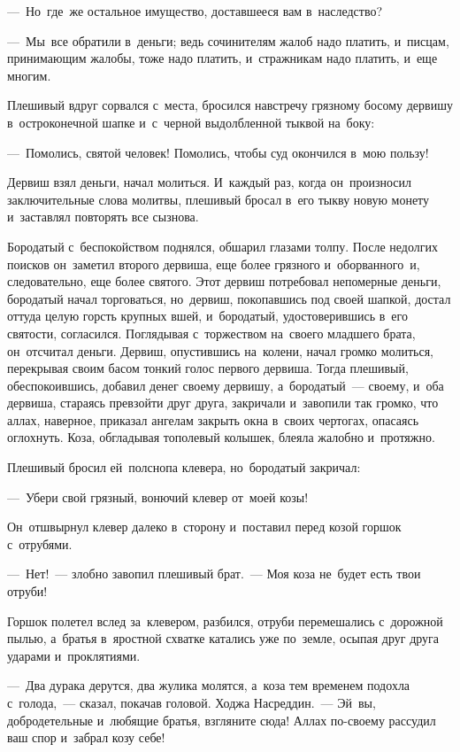 \documentclass[12pt,a4paper]{book}
\begin{document}
—~Но~где~же остальное имущество, доставшееся вам в~наследство?

—~Мы~все обратили в~деньги; ведь сочинителям жалоб надо платить, и~писцам, принимающим жалобы, тоже надо платить, и~стражникам надо платить, и~еще многим.

Плешивый вдруг сорвался с~места, бросился навстречу грязному босому дервишу в~остроконечной шапке и~с~черной выдолбленной тыквой на~боку:

—~Помолись, святой человек! Помолись, чтобы суд окончился в~мою пользу!

Дервиш взял деньги, начал молиться. И~каждый раз, когда он~произносил заключительные слова молитвы, плешивый бросал в~его тыкву новую монету и~заставлял повторять все сызнова.

Бородатый с~беспокойством поднялся, обшарил глазами толпу. После недолгих поисков он~заметил второго дервиша, еще более грязного и~оборванного~и, следовательно, еще более святого. Этот дервиш потребовал непомерные деньги, бородатый начал торговаться, но~дервиш, покопавшись под своей шапкой, достал оттуда целую горсть крупных вшей, и~бородатый, удостоверившись в~его святости, согласился. Поглядывая с~торжеством на~своего младшего брата, он~отсчитал деньги. Дервиш, опустившись на~колени, начал громко молиться, перекрывая своим басом тонкий голос первого дервиша. Тогда плешивый, обеспокоившись, добавил денег своему дервишу, а~бородатый~— своему, и~оба дервиша, стараясь превзойти друг друга, закричали и~завопили так громко, что аллах, наверное, приказал ангелам закрыть окна в~своих чертогах, опасаясь оглохнуть. Коза, обгладывая тополевый колышек, блеяла жалобно и~протяжно.

Плешивый бросил ей~полснопа клевера, но~бородатый закричал:

—~Убери свой грязный, вонючий клевер от~моей козы!

Он~отшвырнул клевер далеко в~сторону и~поставил перед козой горшок с~отрубями.

—~Нет!~— злобно завопил плешивый брат.~— Моя коза не~будет есть твои отруби!

Горшок полетел вслед за~клевером, разбился, отруби перемешались с~дорожной пылью, а~братья в~яростной схватке катались уже по~земле, осыпая друг друга ударами и~проклятиями.

—~Два дурака дерутся, два жулика молятся, а~коза тем временем подохла с~голода,~— сказал, покачав головой. Ходжа Насреддин.~— Эй~вы, добродетельные и~любящие братья, взгляните сюда! Аллах по-своему рассудил ваш спор и~забрал козу себе!
\end{document}
